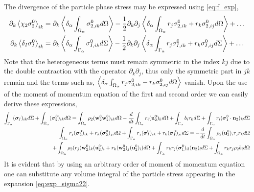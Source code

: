 The divergence of the particle phase stress may be expressed using \ref{eq:f_exp}, 
\begin{align}
    \label{eq:exp_sigma22}
    \partial_k \left<\chi_2 {\sigma}_2^0\right>_{ik}
    &=  \partial_k\left<\delta_\alpha \int_{\Omega_\alpha}  {\sigma}_{2,ik}^0 d\Omega\right>
    -\frac{1}{2} \partial_k\partial_j
    \left<\delta_\alpha \int_{\Omega_\alpha}  r_j{\sigma}^0_{2,ik} + r_k\sigma^0_{2,ij} d\Omega\right>
    + \ldots  \\
    \label{eq:exp_sigmaI2}
    \partial_k \left<\delta_I {\sigma}^0_I\right>_{ik} 
    &=  \partial_k\left<\delta_\alpha \int_{\Gamma_\alpha}  {\sigma}_{I,ik}^0  d\Sigma\right>
        -\frac{1}{2} \partial_k\partial_j \left<\delta_\alpha \int_{\Gamma_\alpha}  r_j {\sigma}_{I,ik}^0+r_k {\sigma}_{I,ij}^0  d\Sigma\right>
        + \ldots  
\end{align}
Note that the heterogeneous terms must remain symmetric in the index $kj$ due to the double contraction with the operator $\partial_k\partial_j$, thus only the symmetric part in $jk$ remain and the terms such as, $\left<\delta_\alpha \int_{\Omega_\alpha}  r_j{\sigma}^0_{2,ik} - r_k\sigma^0_{2,ij} d\Omega\right>$ vanish. 
Upon the use of the moment of momentum equation of the first and second order we can easily derive these expressions, 
\begin{align}
    \int_{\Gamma_\alpha}  (\bm{\sigma}_I)_{ik} d\Sigma
    +\int_{\Omega_\alpha}  (\bm{\sigma}_2^0)_{ik} d\Omega
    = 
    \int_{\Omega_\alpha}  \rho_2 
    (\textbf{w}_2^0\textbf{w}_2^0  )_{ik}
     d\Omega
    -\frac{d}{d t} \int_{\Omega_\alpha}  r_i (\textbf{u}^0_2)_k  d\Omega
    +\int_{\Gamma_\alpha}  
        b_{i}
        r_k 
     d\Sigma
    +\int_{\Gamma_\alpha}  
     r_i (\bm{\sigma}_1^0 \cdot \textbf{n}_2)_{k}
     d\Sigma\\
    \int_{\Omega_\alpha}  r_{j}(\bm{\sigma}^0_2)_{ik}+r_{k}(\bm{\sigma}^0_2)_{ji} d\Omega
    +\int_{\Gamma_\alpha}  r_{j}(\bm{\sigma}^0_I)_{ik}+r_{k}(\bm{\sigma}_I^0)_{ji} d\Sigma
    = 
    - \frac{d}{d t}\int_{\Omega_\alpha}  \rho_2 (\textbf{u}_2^0)_i r_j r_k  d\Omega\nonumber\\
    + \int_{\Omega_\alpha}  \rho_2 (r_{j} (\textbf{w}_2^0)_k (\textbf{u}^0_2)_i + r_k (\textbf{w}_2^0)_j (\textbf{u}^0_2)_i) d\Omega
    +\int_{\Gamma_\alpha}   r_{k}r_{j} (\bm{\sigma}_1^0)_{il} (\textbf{n}_2)_l  d\Sigma
    + \int_{\Omega_\alpha}  r_{k}r_{j}  \rho_2 b_i  d\Omega 
    \label{eq:dt_P2_alpha}
\end{align}
It is evident that by using an arbitrary order of moment of momentum equation one can substitute any volume integral of the particle stress appearing in the expansion \ref{eq:exp_sigma22}. 
